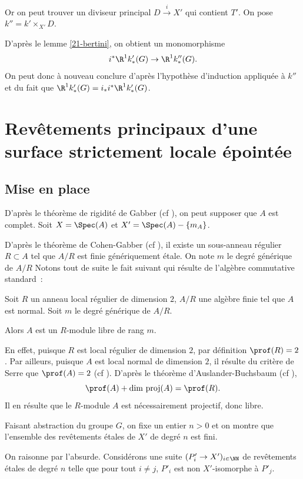 \documentclass[10pt]{../fichiers-configuration-latex/smfart}
\begin{document}
Or on peut trouver un diviseur principal $D \xrightarrow i X'$
 qui contient $T'$.
On pose $k''=k' \times_{X'} D$.

D'après le lemme \ref{21-bertini}, 
on obtient un monomorphisme $$i^* \R^1 k'_*(G) \rightarrow \R^1 k''_*(G).$$
On peut donc à nouveau conclure d'après l'hypothèse d'induction appliquée
à $k''$ et du fait que $\R^1 k'_*(G)=i_*i^* \R^1 k'_*(G)$.

\section{Revêtements principaux d'une surface strictement locale épointée}
\label{21-sec-local}

\subsection{Mise en place}

D'après le théorème de rigidité de Gabber (cf ),
 on peut supposer que $A$ est complet.
Soit $X=\Spec(A)$ et $X'=\Spec(A)-\{\mathfrak{m}_A\}$.

D'après le théorème de Cohen-Gabber (cf ),
 il existe un sous-anneau régulier $R \subset A$
 tel que $A/R$ est finie génériquement étale.
On note $m$ le degré générique de $A/R$
Notons tout de suite le fait suivant qui résulte de l'algèbre
commutative standard~:
\begin{lemme} \label{21-facile}
Soit $R$ un anneau local régulier de dimension $2$,
 $A/R$ une algèbre finie tel que $A$ est normal.
Soit $m$ le degré générique de $A/R$.

Alors $A$ est un $R$-module libre de rang $m$.
\end{lemme}
En effet, puisque $R$ est local régulier de dimension $2$,
 par définition $\prof(R)=2$.
Par ailleurs, puisque $A$ est local normal de dimension $2$,
 il résulte du critère de Serre que $\prof(A)=2$ (cf \cite[ex.
17.3]{CRT@Matsumura}).
D'après le théorème d'Auslander-Buchsbaum (cf \cite[th.
19.1]{CRT@Matsumura}),
$$\prof(A)+\mathrm{dim\ proj}(A)=\prof(R).$$ Il en résulte que 
le $R$-module $A$
 est nécessairement projectif, donc libre.

Faisant abstraction du groupe $G$,
 on fixe un entier $n>0$ et on montre que l'ensemble
  des revêtements étales de $X'$ de degré $n$ est fini.

On raisonne par l'absurde.
Considérons une suite $(P'_i \rightarrow X')_{i \in \NN}$
 de revêtements étales de degré $n$ telle que pour
  tout $i \neq j$, $P'_i$ est non $X'$-isomorphe à $P'_j$.
\end{document}
